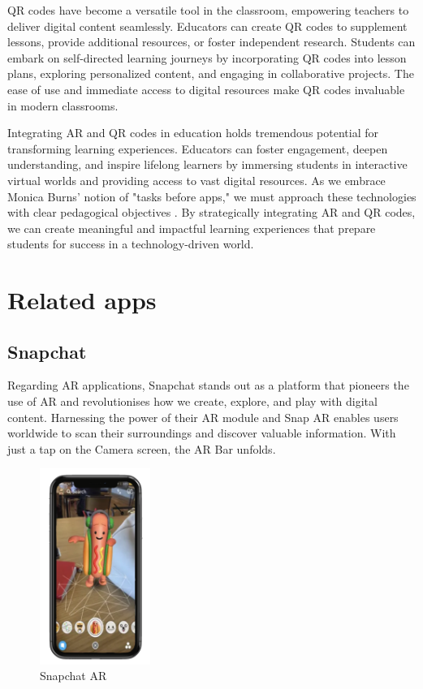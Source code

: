 \ac{QR} codes have become a versatile tool in the classroom, empowering teachers to deliver digital content seamlessly. Educators can create \ac{QR} codes to supplement lessons, provide additional resources, or foster independent research. Students can embark on self-directed learning journeys by incorporating \ac{QR} codes into lesson plans, exploring personalized content, and engaging in collaborative projects. The ease of use and immediate access to digital resources make \ac{QR} codes invaluable in modern classrooms.

Integrating \ac{AR} and \ac{QR} codes in education holds tremendous potential for transforming learning experiences. Educators can foster engagement, deepen understanding, and inspire lifelong learners by immersing students in interactive virtual worlds and providing access to vast digital resources. As we embrace Monica Burns' notion of "tasks before apps," we must approach these technologies with clear pedagogical objectives \cite{Burns2016}. By strategically integrating \ac{AR} and \ac{QR} codes, we can create meaningful and impactful learning experiences that prepare students for success in a technology-driven world.


\section{Related apps}
\subsection*{Snapchat}
Regarding \ac{AR} applications, Snapchat \cite{Snapchat} stands out as a platform that pioneers the use of \ac{AR} and revolutionises how we create, explore, and play with digital content. Harnessing the power of their \ac{AR} module and Snap \ac{AR} \cite{SnapAR} enables users worldwide to scan their surroundings and discover valuable information. With just a tap on the Camera screen, the \ac{AR} Bar unfolds.

\begin{figure}
    \centering
    \includegraphics[width=0.32\textwidth]{img/related-apps/Snapchat.png}
    \caption{Snapchat AR}
    \label{fig:snapchat}
\end{figure}

